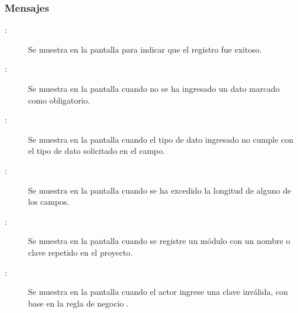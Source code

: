 \subsubsection{Mensajes}
	
\begin{description}
	\item[:] Se muestra en la pantalla  para indicar que el registro fue exitoso.
	\item[:] Se muestra en la pantalla  cuando no se ha ingresado un dato marcado como obligatorio.
	\item[:] Se muestra en la pantalla  cuando el tipo de dato ingresado no cumple con el tipo de dato solicitado en el campo.
	\item[:] Se muestra en la pantalla  cuando se ha excedido la longitud de alguno de los campos.
	\item[:] Se muestra en la pantalla  cuando se registre un módulo con un nombre o clave repetido en el proyecto.
	\item[:] Se muestra en la pantalla  cuando el actor ingrese una clave inválida, con base en la regla de negocio .
\end{description}
